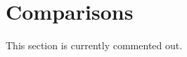 \documentclass[a4paper,twocolumn,11pt,accepted=2017-05-09]{quantumarticle}
\begin{document}
 \section{Comparisons}
    This section is currently commented out.
% 
% 
%  
%  
%  
%  
%  
\end{document}
